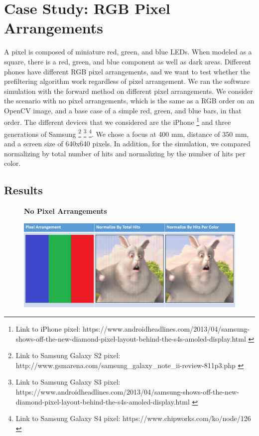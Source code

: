 \chapter{Case Study: RGB Pixel Arrangements}

A pixel is composed of miniature red, green, and blue LEDs. When modeled as a square, there is a red, green, and blue component as well as dark areas. Different phones have different RGB pixel arrangements, and we want to test whether the prefiltering algorithm work regardless of pixel arrangement. We ran the software simulation with the forward method on different pixel arrangements. We consider the scenario with no pixel arrangements, which is the same as a RGB order on an OpenCV image, and a base case of a simple red, green, and blue bars, in that order. The different devices that we considered are the iPhone \footnote{Link to iPhone pixel: https://www.androidheadlines.com/2013/04/samsung-shows-off-the-new-diamond-pixel-layout-behind-the-s4s-amoled-display.html \cite{android:headlines}} and three generations of Samsung \footnote{Link to Samsung Galaxy S2 pixel: http://www.gsmarena.com/samsung\_galaxy\_note\_ii-review-811p3.php \cite{gsmarena}} \footnote{Link to Samsung Galaxy S3 pixel: https://www.androidheadlines.com/2013/04/samsung-shows-off-the-new-diamond-pixel-layout-behind-the-s4s-amoled-display.html \cite{android:headlines}}  \footnote{Link to Samsung Galaxy S4 pixel: https://www.chipworks.com/ko/node/126 \cite{chipworks}}. We chose a focus at 400 mm, distance of 350 mm, and a screen size of 640x640 pixels. In addition, for the simulation, we compared normalizing by total number of hits and normalizing by the number of hits per color.

\section{Results}


\begin{figure}
    \centering
    \textbf{No Pixel Arrangements}\par\medskip
    \includegraphics[width=6in]{chapters/chapter7/images/No_Pixel_Arrangement.png}
\end{figure}

